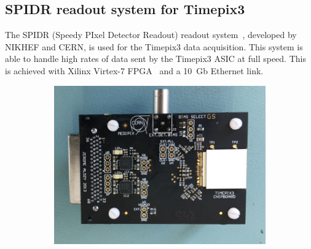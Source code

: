 \subsection{SPIDR readout system for Timepix3}\label{sec:TimepixReadout}

The SPIDR (Speedy PIxel Detector Readout) readout
system~\cite{Visser:2015bsa}, developed by NIKHEF and CERN, is used
for the Timepix3 data acquisition. This system is able to handle high
rates of data sent by the Timepix3 ASIC at full speed. This is
achieved with Xilinx Virtex-7 FPGA~\cite{XilinxVirtex7} and a 10~Gb
Ethernet link.

\begin{figure}[htbp] \centering
  \begin{subfigure}[b]{0.3\textwidth}
    \includegraphics[width=\textwidth]{./figures/Calibration/Timepix3board2.jpg}
    \caption{}\label{fig:Timepix3board_PCB}
  \end{subfigure}\hfill
  \begin{subfigure}[b]{0.65\textwidth}

\end{subfigure}
\end{figure}
